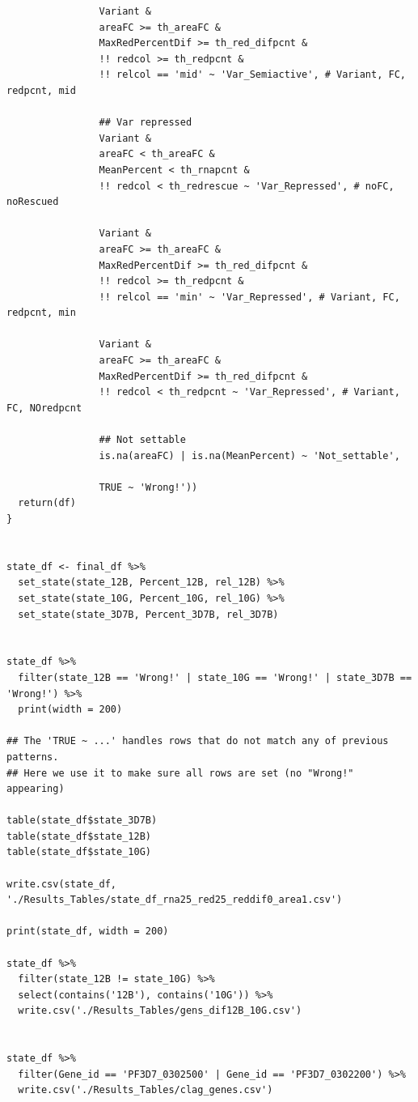 \documentclass[11pt]{article}
\begin{document}
\begin{verbatim}
                Variant &
                areaFC >= th_areaFC &
                MaxRedPercentDif >= th_red_difpcnt &
                !! redcol >= th_redpcnt &
                !! relcol == 'mid' ~ 'Var_Semiactive', # Variant, FC, redpcnt, mid

                ## Var repressed
                Variant &
                areaFC < th_areaFC &
                MeanPercent < th_rnapcnt &
                !! redcol < th_redrescue ~ 'Var_Repressed', # noFC, noRescued

                Variant &
                areaFC >= th_areaFC &
                MaxRedPercentDif >= th_red_difpcnt &
                !! redcol >= th_redpcnt &
                !! relcol == 'min' ~ 'Var_Repressed', # Variant, FC, redpcnt, min

                Variant &
                areaFC >= th_areaFC &
                MaxRedPercentDif >= th_red_difpcnt &
                !! redcol < th_redpcnt ~ 'Var_Repressed', # Variant, FC, NOredpcnt

                ## Not settable
                is.na(areaFC) | is.na(MeanPercent) ~ 'Not_settable',

                TRUE ~ 'Wrong!'))
  return(df)
}


state_df <- final_df %>%
  set_state(state_12B, Percent_12B, rel_12B) %>%
  set_state(state_10G, Percent_10G, rel_10G) %>%
  set_state(state_3D7B, Percent_3D7B, rel_3D7B)


state_df %>%
  filter(state_12B == 'Wrong!' | state_10G == 'Wrong!' | state_3D7B == 'Wrong!') %>%
  print(width = 200)

## The 'TRUE ~ ...' handles rows that do not match any of previous patterns.
## Here we use it to make sure all rows are set (no "Wrong!" appearing)

table(state_df$state_3D7B)
table(state_df$state_12B)
table(state_df$state_10G)

write.csv(state_df, './Results_Tables/state_df_rna25_red25_reddif0_area1.csv')

print(state_df, width = 200)

state_df %>%
  filter(state_12B != state_10G) %>%
  select(contains('12B'), contains('10G')) %>%
  write.csv('./Results_Tables/gens_dif12B_10G.csv')


state_df %>%
  filter(Gene_id == 'PF3D7_0302500' | Gene_id == 'PF3D7_0302200') %>%
  write.csv('./Results_Tables/clag_genes.csv')
\end{verbatim}
\end{document}
